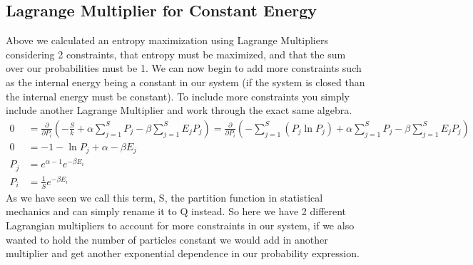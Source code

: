\documentclass{article}
\begin{document}
\subsection*{Lagrange Multiplier for Constant Energy}
Above we calculated an entropy maximization using Lagrange Multipliers considering 2 constraints, that entropy must be maximized, and that the sum over our probabilities must be 1. 
We can now begin to add more constraints such as the internal energy being a constant in our system (if the system is closed than the internal energy must be constant). 
To include more constraints you simply include another Lagrange Multiplier and work through the exact same algebra. 
\begin{equation}
\begin{split}
    0 &= \frac{\partial}{\partial P_i} \left( -\frac{S}{k} + \alpha\sum_{j=1}^S P_j - \beta \sum_{j=1}^S E_jP_j \right) =
     \frac{\partial}{\partial P_i} \left( -\sum_{j=1}^S \left( P_j\ln P_j  \right) + \alpha\sum_{j=1}^S P_j - \beta \sum_{j=1}^S E_jP_j \right) \\
     0 &= -1 -\ln P_j + \alpha -\beta E_j \\
     P_j &= e^{\alpha -1}e^{-\beta E_i} \\
     P_i &= \frac{1}{S}e^{-\beta E_i}
\end{split}
\end{equation}
As we have seen we call this term, S, the partition function in statistical mechanics and can simply rename it to Q instead. 
So here we have 2 different Lagrangian multipliers to account for more constraints in our system, if we also wanted to hold the number of particles constant we would add in another multiplier and get another exponential dependence in our probability expression. 
\end{document}
